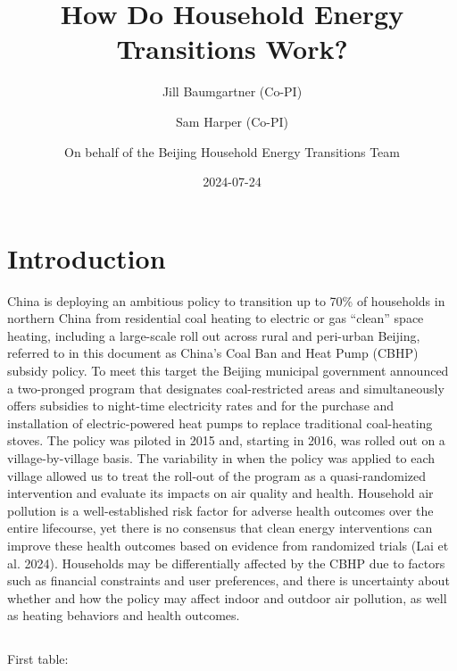 \documentclass[
  letterpaper,
  DIV=11,
  numbers=noendperiod]{scrartcl}
\title{How Do Household Energy Transitions Work?}
\author{Jill Baumgartner (Co-PI) \and Sam Harper (Co-PI) \and On behalf
of the Beijing Household Energy Transitions Team}
\date{2024-07-24}
\renewcommand*\contentsname{Table of contents}
\newcommand\contentsname{Table of contents}
\providecommand{\DIFaddtex}[1]{{\protect\color{blue}\uwave{#1}}} %
\providecommand{\DIFaddbegin}{} %
\providecommand{\DIFaddend}{} %
\providecommand{\DIFadd}[1]{\texorpdfstring{\DIFaddtex{#1}}{#1}} %
\newcommand{\DIFaddincludegraphics}[2][]{{\color{blue}\fbox{\DIFOincludegraphics[#1]{#2}}}} %
\DeclareRobustCommand{\DIFaddbegin}{\DIFOaddbegin \let\includegraphics\DIFaddincludegraphics} %
\DeclareRobustCommand{\DIFaddend}{\DIFOaddend \let\includegraphics\DIFOincludegraphics} %
\begin{document}
\maketitle
\renewcommand*\contentsname{Table of contents}
{
\hypersetup{linkcolor=}
\setcounter{tocdepth}{3}
\tableofcontents
}
\newpage

\section{Introduction}\label{introduction}

China is deploying an ambitious policy to transition up to 70\% of
households in northern China from residential coal heating to electric
or gas ``clean'' space heating, including a large-scale roll out across
rural and peri-urban Beijing, referred to in this document as China's
Coal Ban and Heat Pump (CBHP) subsidy policy. To meet this target the
Beijing municipal government announced a two-pronged program that
designates coal-restricted areas and simultaneously offers subsidies to
night-time electricity rates and for the purchase and installation of
electric-powered heat pumps to replace traditional coal-heating stoves.
The policy was piloted in 2015 and, starting in 2016, was rolled out on
a village-by-village basis. The variability in when the policy was
applied to each village allowed us to treat the roll-out of the program
as a quasi-randomized intervention and evaluate its impacts on air
quality and health. Household air pollution is a well-established risk
factor for adverse health outcomes over the entire lifecourse, yet there
is no consensus that clean energy interventions can improve these health
outcomes based on evidence from randomized trials (Lai et al. 2024).
Households may be differentially affected by the CBHP due to factors
such as financial constraints and user preferences, and there is
uncertainty about whether and how the policy may affect indoor and
outdoor air pollution, as well as heating behaviors and health outcomes.

\DIFaddbegin \subsection{\DIFadd{Subheading}}\label{subheading}

\DIFaddend First table:
\end{document}
